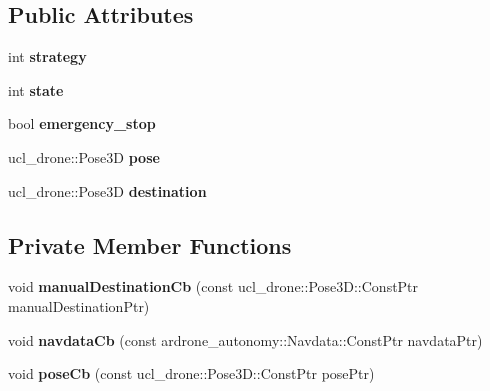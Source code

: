 \subsection*{Public Attributes}
\begin{DoxyCompactItemize}
\item 
\mbox{\label{classStrategy_a31ba8ee1e14540db60dcceb88779bb61}} 
int {\bfseries strategy}
\item 
\mbox{\label{classStrategy_a345025c5108d57560eefb595e502fbfc}} 
int {\bfseries state}
\item 
\mbox{\label{classStrategy_a912b520d791d89042528945fa9ba40c9}} 
bool {\bfseries emergency\+\_\+stop}
\item 
\mbox{\label{classStrategy_aa9cef6e1f9a3f2270f84f43e6d167222}} 
ucl\+\_\+drone\+::\+Pose3D {\bfseries pose}
\item 
\mbox{\label{classStrategy_a6f83c4b3d1f6c4d4ec94868d33dc4353}} 
ucl\+\_\+drone\+::\+Pose3D {\bfseries destination}
\end{DoxyCompactItemize}
\subsection*{Private Member Functions}
\begin{DoxyCompactItemize}
\item 
\mbox{\label{classStrategy_a76355a6fc70c8d4c78a700423c154eba}} 
void {\bfseries manual\+Destination\+Cb} (const ucl\+\_\+drone\+::\+Pose3\+D\+::\+Const\+Ptr manual\+Destination\+Ptr)
\item 
\mbox{\label{classStrategy_aa59b2ad936c1b75c1853f5c5087505a0}} 
void {\bfseries navdata\+Cb} (const ardrone\+\_\+autonomy\+::\+Navdata\+::\+Const\+Ptr navdata\+Ptr)
\item 
\mbox{\label{classStrategy_a9e9fca352e67441b32b28b27bf1e0c79}} 
void {\bfseries pose\+Cb} (const ucl\+\_\+drone\+::\+Pose3\+D\+::\+Const\+Ptr pose\+Ptr)
\end{DoxyCompactItemize}
